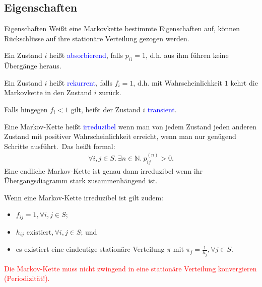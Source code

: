 \documentclass{beamer}
\def\padding{\vspace{0.5cm}}
\def\spadding{\vspace{0.25cm}}
\def\b{\textcolor{blue}}
\def\r{\textcolor{red}}
\begin{document}
\subsection{Eigenschaften}
\begin{frame}{Eigenschaften}
    Weißt eine Markovkette bestimmte Eigenschaften auf, können Rückschlüsse auf ihre stationäre Verteilung gezogen werden.\pause\par\padding
    \begin{definition}
        Ein Zustand $i$ heißt \b{absorbierend}, falls $p_{ii} = 1$, d.h. aus ihm führen keine Übergänge heraus.\pause\par\spadding
        Ein Zustand $i$ heißt \b{rekurrent}, falls $f_{i} = 1$, d.h. mit Wahrscheinlichkeit $1$ kehrt die Markovkette in den Zustand $i$ zurück.\pause\par
        Falls hingegen $f_{i} < 1$ gilt, heißt der Zustand $i$ \b{transient}.
    \end{definition}
\end{frame}

\begin{frame}
    \begin{definition}
        Eine Markov-Kette heißt \b{irreduzibel} wenn man von jedem Zustand jeden anderen Zustand mit positiver Wahrscheinlichkeit erreicht, wenn man nur genügend Schritte ausführt.\pause\ Das heißt formal:
        \begin{align*}
            \forall i, j \in S.\ \exists n \in \mathbb{N}.\ p_{ij}^{(n)} > 0.
        \end{align*}\pause
        Eine endliche Markov-Kette ist genau dann irreduzibel wenn ihr Übergangsdiagramm stark zusammenhängend ist.\pause\par\spadding
        Wenn eine Markov-Kette irreduzibel ist   gilt zudem:\pause
        \begin{itemize}
            \item $f_{ij} = 1, \forall i, j \in S$\pause;
            \item $h_{ij} \text{ existiert}, \forall i, j \in S$\pause; und
            \item es existiert eine eindeutige stationäre Verteilung $\pi$ mit $\pi_j = \frac{1}{h_{j}}, \forall j \in S$.
        \end{itemize}\pause
        \r{Die Markov-Kette muss nicht zwingend in eine stationäre Verteilung konvergieren (Periodizität!).}
    \end{definition}
\end{frame}
\end{document}
